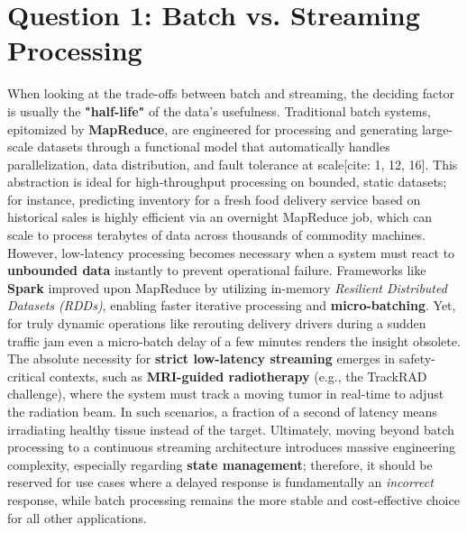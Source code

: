 \section{Question 1: Batch vs. Streaming Processing}

When looking at the trade-offs between batch and streaming, the deciding factor is usually the \textbf{"half-life"} of the data's usefulness. Traditional batch systems, epitomized by \textbf{MapReduce}, are engineered for processing and generating large-scale datasets through a functional model that automatically handles parallelization, data distribution, and fault tolerance at scale[cite: 1, 12, 16]. This abstraction is ideal for high-throughput processing on bounded, static datasets; for instance, predicting inventory for a fresh food delivery service based on historical sales is highly efficient via an overnight MapReduce job, which can scale to process terabytes of data across thousands of commodity machines. However, low-latency processing becomes necessary when a system must react to \textbf{unbounded data} instantly to prevent operational failure. Frameworks like \textbf{Spark} improved upon MapReduce by utilizing in-memory \textit{Resilient Distributed Datasets (RDDs)}, enabling faster iterative processing and \textbf{micro-batching}. Yet, for truly dynamic operations like rerouting delivery drivers during a sudden traffic jam even a micro-batch delay of a few minutes renders the insight obsolete. The absolute necessity for \textbf{strict low-latency streaming} emerges in safety-critical contexts, such as \textbf{MRI-guided radiotherapy} (e.g., the TrackRAD challenge), where the system must track a moving tumor in real-time to adjust the radiation beam. In such scenarios, a fraction of a second of latency means irradiating healthy tissue instead of the target. Ultimately, moving beyond batch processing to a continuous streaming architecture introduces massive engineering complexity, especially regarding \textbf{state management}; therefore, it should be reserved for use cases where a delayed response is fundamentally an \textit{incorrect} response, while batch processing remains the more stable and cost-effective choice for all other applications.









